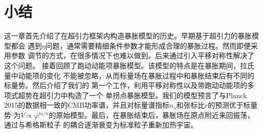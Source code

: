 \section{小结}

这一章首先介绍了在超引力框架内构造暴胀模型的历史。早期基于超引力的暴胀模型都会
遇到$\eta$问题，通常需要精细条件参数才能形成合理的暴胀过程。然而即便采用参数
调节的方式，在很多情况下也难以做到。后来通过引入平移对称性解决了这个问题。
接着回顾了跑动动能项暴胀模型。该模型的特点是在暴胀期间，拉氏量中动能项的变化
不能被忽略，从而标量场在暴胀过程中和暴胀结束后有不同的标量势。然后介绍了我们的
第一个工作，利用平移对称性以及带跑动动能项的多项式超势在超引力中构造了一个
单拐点暴胀模型。我们的模型预言了与Planck
2015的数据相一致的CMB功率谱，并且对标量谱指标$n_{s}$和张标比$r$的预测优于标量势
为$V\propto \varphi^{m
/n}$的原始模型。最后，在暴胀结束后，暴胀场在原点附近来回振荡，通过与希格斯粒子
的耦合逐渐衰变为标准粒子重新加热宇宙。
